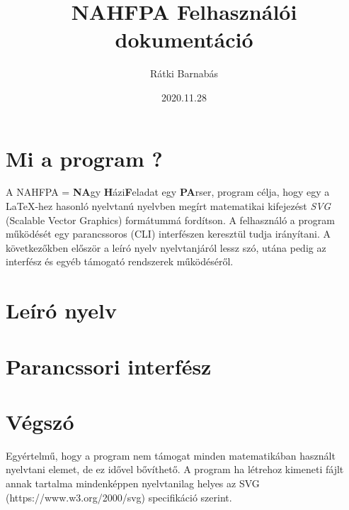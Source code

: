 \documentclass{article}[12pt,a4paper]
\title{NAHFPA Felhasználói dokumentáció}
\author{Rátki Barnabás}
\date{2020.11.28}
\begin{document}
    \maketitle

    \tableofcontents

    \section{Mi a program ?}\label{sec:mi-a-program-?}
    A NAHFPA = \textbf{NA}gy \textbf{H}ázi\textbf{F}eladat egy \textbf{PA}rser, program célja, hogy egy a \LaTeX -hez hasonló nyelvtanú
    nyelvben megírt matematikai kifejezést \textit{SVG} (Scalable Vector Graphics) formátummá fordítson.
    A felhasználó a program működését egy parancssoros (CLI) interfészen keresztül tudja irányítani.
    A következőkben először a leíró nyelv nyelvtanjáról lessz szó, utána pedig az interfész és egyéb támogató rendszerek működéséről.

    \section{Leíró nyelv}\label{sec:leíró-nyelv}
    

    \section{Parancssori interfész}\label{sec:cli}
    

    \section{Végszó}\label{sec:vég}
    Egyértelmű, hogy a program nem támogat minden matematikában használt nyelvtani elemet, de ez idővel bővíthető.
    A program ha létrehoz kimeneti fájlt annak tartalma mindenképpen nyelvtanilag helyes az SVG (https://www.w3.org/2000/svg) specifikáció szerint.
\end{document}
